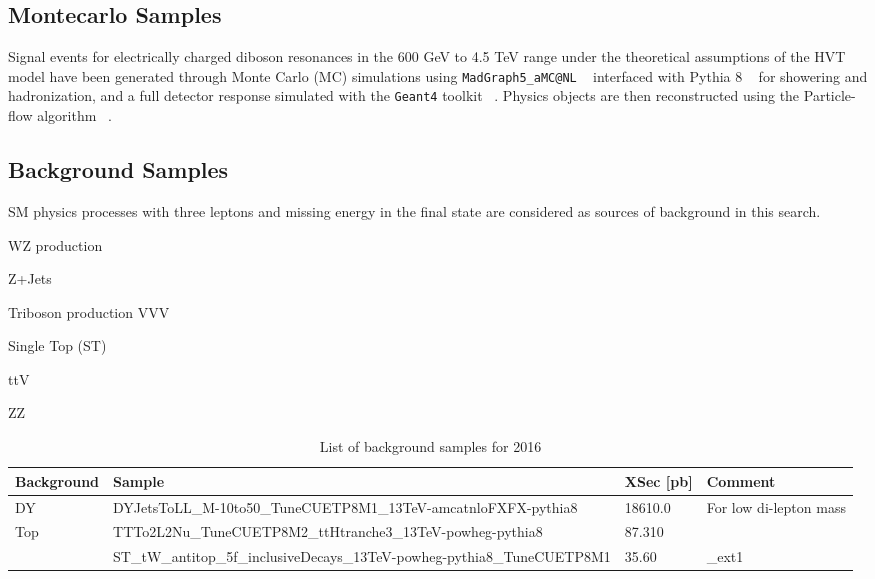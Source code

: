 \subsection{Montecarlo Samples}

Signal events for electrically charged diboson resonances in the 600 GeV
to 4.5 TeV range under the theoretical assumptions of the HVT model
have been generated through Monte Carlo (MC) simulations
using \verb|MadGraph5_aMC@NL| ~\cite{madgraph} interfaced with Pythia 8
~\cite{pythia} for showering and hadronization, and a
full detector response simulated with the \verb|Geant4| toolkit ~\cite{geant4}.
Physics objects are then reconstructed using the
Particle-flow algorithm ~\cite{particleflow}.

\subsection{Background Samples}

SM physics processes with three leptons and missing energy in the final state
are considered as sources of background in this search.

WZ production

Z+Jets

Triboson production VVV

Single Top (ST)

ttV

ZZ









\begin{sidewaystable}[htb]
\begin{center}
\caption{List of background samples for 2016}
\footnotesize
\begin{tabular}{|l|l|l|l|}
\hline
Background  & Sample & XSec [pb] & Comment \\ \hline
DY          & DYJetsToLL\_M-10to50\_TuneCUETP8M1\_13TeV-amcatnloFXFX-pythia8      & 18610.0 & For low di-lepton mass \\ %
Top         & TTTo2L2Nu\_TuneCUETP8M2\_ttHtranche3\_13TeV-powheg-pythia8          & 87.310 & \\ %
& ST\_tW\_antitop\_5f\_inclusiveDecays\_13TeV-powheg-pythia8\_TuneCUETP8M1        & 35.60 & \_ext1 \\ \hline %
\end{tabular}
\label{tab:BkgList1}
\end{center}
\end{sidewaystable}



